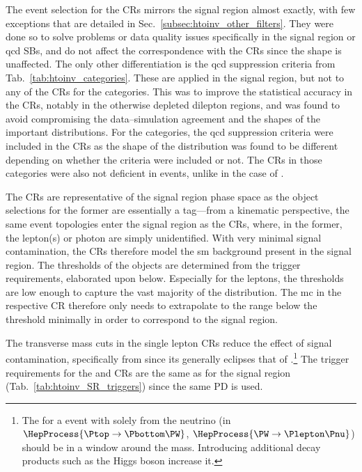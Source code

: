 \noindent{}The event selection for the \glspl{CR} mirrors the signal region almost exactly, with few exceptions that are detailed in Sec.~\ref{subsec:htoinv_other_filters}. They were done so to solve problems or data quality issues specifically in the signal region or \acrshort{qcd} \glspl{SB}, and do not affect the correspondence with the \glspl{CR} since the \ptmiss shape is unaffected. The only other differentiation is the \acrshort{qcd} suppression criteria from Tab.~\ref{tab:htoinv_categories}. These are applied in the signal region, but not to any of the \glspl{CR} for the \ttH categories. This was to improve the statistical accuracy in the \glspl{CR}, notably in the otherwise depleted dilepton regions, and was found to avoid compromising the data--simulation agreement and the shapes of the important distributions. For the \VH categories, the \acrshort{qcd} suppression criteria were included in the \glspl{CR} as the shape of the \ptmiss distribution was found to be different depending on whether the criteria were included or not. The \glspl{CR} in those categories were also not deficient in events, unlike in the case of \ttH.

The \glspl{CR} are representative of the signal region phase space as the object selections for the former are essentially a tag---from a kinematic perspective, the same event topologies enter the signal region as the \glspl{CR}, where, in the former, the lepton(s) or photon are simply unidentified. With very minimal signal contamination, the \glspl{CR} therefore model the \acrlong{sm} background present in the signal region. The \pt thresholds of the objects are determined from the trigger requirements, elaborated upon below. Especially for the leptons, the thresholds are low enough to capture the vast majority of the \pt distribution. The \acrshort{mc} in the respective \gls{CR} therefore only needs to extrapolate to the \pt range below the threshold minimally in order to correspond to the signal region.

The transverse mass cuts in the single lepton \glspl{CR} reduce the effect of signal contamination, specifically from \ttH since its \mT generally eclipses that of \ttbar.\footnote{The \mT for a \ttbar event with \ptvecmiss solely from the neutrino (in $\HepProcess{\Ptop \to \Pbottom\PW}$, $\HepProcess{\PW \to \Plepton\Pnu}$) should be in a window around the \PW mass. Introducing additional decay products such as the Higgs boson increase it.} The trigger requirements for the \singleMuCr and \doubleMuCr \glspl{CR} are the same as for the signal region (Tab.~\ref{tab:htoinv_SR_triggers}) since the same \gls{PD} is used.

